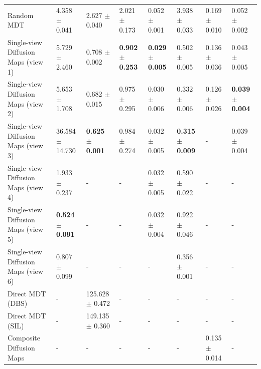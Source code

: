 \begin{table}
\begin{tabular}{llllllll}
Random MDT & 4.358 $\pm$ 0.041 & 2.627 $\pm$ 0.040 & 2.021 $\pm$ 0.173 & 0.052 $\pm$ 0.001 & 3.938 $\pm$ 0.033 & 0.169 $\pm$ 0.010 & 0.052 $\pm$ 0.002 \\
Single-view Diffusion Maps (view 1) & 5.729 $\pm$ 2.460 & 0.708 $\pm$ 0.002 & \textbf{0.902 $\pm$ 0.253} & \textbf{0.029 $\pm$ 0.005} & 0.502 $\pm$ 0.005 & 0.136 $\pm$ 0.036 & 0.043 $\pm$ 0.005 \\
Single-view Diffusion Maps (view 2) & 5.653 $\pm$ 1.708 & 0.682 $\pm$ 0.015 & 0.975 $\pm$ 0.295 & 0.030 $\pm$ 0.006 & 0.332 $\pm$ 0.006 & 0.126 $\pm$ 0.026 & \textbf{0.039 $\pm$ 0.004} \\
Single-view Diffusion Maps (view 3) & 36.584 $\pm$ 14.730 & \textbf{0.625 $\pm$ 0.001} & 0.984 $\pm$ 0.274 & 0.032 $\pm$ 0.005 & \textbf{0.315 $\pm$ 0.009} & - & 0.039 $\pm$ 0.004 \\
Single-view Diffusion Maps (view 4) & 1.933 $\pm$ 0.237 & - & - & 0.032 $\pm$ 0.005 & 0.590 $\pm$ 0.022 & - & - \\
Single-view Diffusion Maps (view 5) & \textbf{0.524 $\pm$ 0.091} & - & - & 0.032 $\pm$ 0.004 & 0.922 $\pm$ 0.046 & - & - \\
Single-view Diffusion Maps (view 6) & 0.807 $\pm$ 0.099 & - & - & - & 0.356 $\pm$ 0.001 & - & - \\
Direct MDT (DBS) & - & 125.628 $\pm$ 0.472 & - & - & - & - & - \\
Direct MDT (SIL) & - & 149.135 $\pm$ 0.360 & - & - & - & - & - \\
Composite Diffusion Maps & - & - & - & - & - & 0.135 $\pm$ 0.014 & - \\
\bottomrule
\end{tabular}
\end{table}